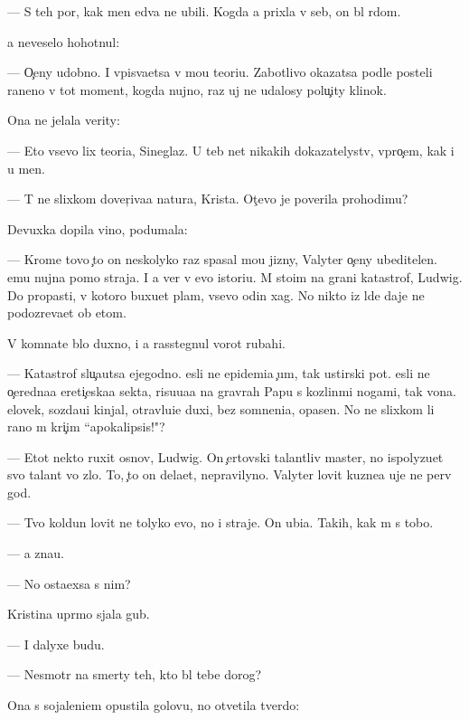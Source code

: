 \documentclass[10pt]{book}
\begin{document}
— S teh por, kak men{\ia} {\y}edva ne ubili. Kogda {\y}a prixla v seb{\ia}, on b{\yi}l r{\ia}dom.

{\Y}a neveselo hohotnul:

— O{\c}eny udobno. I vpis{\yi}va{\y}etsa v mo{\y}u teori{\y}u. Zabotlivo okazatsa podle posteli raneno{\y} v tot moment, kogda nujno, raz uj ne udalosy polu{\c}ity klinok.

Ona ne jelala verity:

— Eto vsevo lix teori{\y}a, Sineglaz{\yi}{\y}. U teb{\ia} net nikakih dokazatelystv, vpro{\c}em, kak i u men{\ia}.

— T{\yi} ne slixkom dover{\c}iva{\y}a natura, Krista. Ot{\c}evo je poverila prohodim{\q}u?

Devuxka dopila vino, podumala:

— Krome tovo {\c}to on neskolyko raz spasal mo{\y}u jizny, Valyter o{\c}eny ubeditelen. {\Y}emu nujna pomo{\x} straja. I {\y}a ver{\iu} v {\y}evo istori{\y}u. M{\yi} sto{\y}im na grani katastrof{\yi}, Ludwig. Do propasti, v kotoro{\y} buxu{\y}et plam{\ia}, vsevo odin xag. No nikto iz l{\iu}de{\y} daje ne podozreva{\y}et ob etom.

V komnate b{\yi}lo duxno, i {\y}a rasstegnul vorot rubahi.

— Katastrof{\yi} slu{\c}a{\y}utsa {\y}ejegodno. {\Y}esli ne epidemi{\y}a {\c}um{\yi}, tak {\y}ustirski{\y} pot. {\Y}esli ne o{\c}eredna{\y}a {\y}ereti{\c}eska{\y}a sekta, risu{\y}u{\x}a{\y}a na grav{\iu}rah Papu s kozlin{\yi}mi nogami, tak vo{\y}na. {\C}elovek, sozda{\y}u{\x}i{\y} kinjal{\yi}, otravl{\ia}{\y}u{\x}i{\y}e duxi, bez somneni{\y}a, opasen. No ne slixkom li rano m{\yi} kri{\c}im ``apokalipsis!"?

— Etot nekto ruxit osnov{\yi}, Ludwig. On {\c}ertovski talantliv{\yi}{\y} master, no ispolyzu{\y}et svo{\y} talant vo zlo. To, {\c}to on dela{\y}et, nepravilyno. Valyter lovit kuzne{\q}a uje ne perv{\yi}{\y} god.

— Tvo{\y} koldun lovit ne tolyko {\y}evo, no i straje{\y}. On ubi{\y}{\q}a. Takih, kak m{\yi} s tobo{\y}.

— {\Y}a zna{\y}u.

— No osta{\y}exsa s nim?

Kristina upr{\ia}mo sjala gub{\yi}.

— I dalyxe budu.

— Nesmotr{\ia} na smerty teh, kto b{\yi}l tebe dorog?

Ona s sojaleni{\y}em opustila golovu, no otvetila tverdo:
\end{document}
